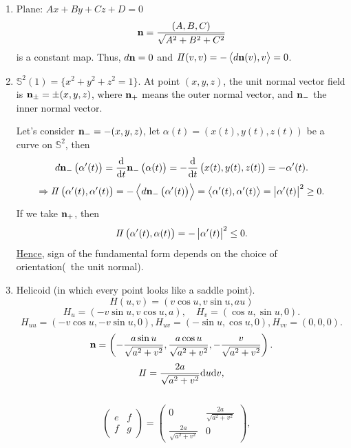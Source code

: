 \begin{example}
    \begin{enumerate}[(1)]
        \hfill
        \item Plane: \(Ax +B y+C z+D=0 \)
        \[\vb{n}=\frac{(A,B,C)}{\sqrt{A^2+B^2+C^2}}\]
        is a constant map. Thus, 
        \(
            d\vb{n}=0    
        \) and \(I\!I(v,v)=-\left\langle d\vb{n}(v),v\right\rangle=0\).
        \item \(\mathbb{S}^2(1)=\{x^2+y^2+z^2=1\}\).
        At point \((x,y,z)\), the unit normal vector field is 
        \(\vb{n}_{\pm}=\pm (x,y,z)\), where \(\vb{n}_+\) means 
        the outer normal vector, and \(\vb{n}_-\) the inner normal 
        vector.

        Let's consider \(\vb{n}_-=-(x,y,z)\), let \(\alpha(t)=\left(
        x(t),y(t),z(t)\right)\) be a curve on \(\mathbb{S}^2\), then 
        \[
            d \vb{n}_-\left(\alpha'(t)\right)
            =\dv{t}\vb{n}_- \left(\alpha(t)\right)
            =-\dv{t}\left(x(t),y(t),z(t)\right)
            =-\alpha'(t)    
        .\]
        \[\Rightarrow
            I\!I\left(\alpha'(t),\alpha'(t)\right)
            =-\left\langle d\vb{n}_-\left(\alpha'(t)\right)
            \right\rangle=\left\langle\alpha'(t),\alpha'(t)
            \right\rangle=\left|\alpha'(t)\right|^2\ge 0.
        \]
        If we take \(\vb{n}_+\), then 
        \[I\!I\left(\alpha'(t),\alpha(t)\right)=
        -\left|\alpha'(t)\right|^2\le 0.\]
        \underline{Hence}, sign of the  fundamental form
    depends on the choice of orientation(\ie\ the unit normal).
    \item Helicoid (in which every point looks like a saddle point).
    \[H(u,v)=(v\cos u,v\sin u,a u)\]
    \[H_u=(-v\sin u,v\cos u,a),\quad H_v=(\cos u,\sin u,0).\]
    \[H_{uu}=(-v\cos u,-v\sin u,0),H_{uv}=(-\sin u,\cos u,0),
    H_{vv}=(0,0,0).
    \]
    \[
        \vb{n}=\left(-\frac{a\sin u}{\sqrt{a^2+v^2}},
        \frac{a\cos u}{\sqrt{a^2+v^2}},
        -\frac{v}{\sqrt{a^2+v^2}}
        \right).    
    \]
    \[
        I\!I=\frac{2a}{\sqrt{a^2+v^2}}\dd u\dd v    ,
    \]
    \ie\ 
    \[
        \begin{pmatrix}
            e&f\\
            f&g
        \end{pmatrix}=\begin{pmatrix}
            0&\frac{2a}{\sqrt{a^2+v^2}}\\
            \frac{2a}{\sqrt{a^2+v^2}}&0
        \end{pmatrix},\quad
\]
\end{enumerate}
\end{example}
